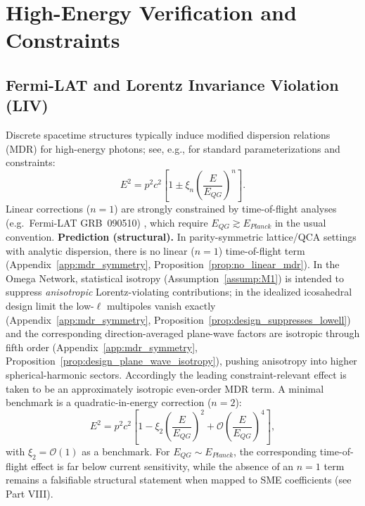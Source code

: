 \section{High-Energy Verification and Constraints}
\label{chap:verification}

\subsection{Fermi-LAT and Lorentz Invariance Violation (LIV)}
Discrete spacetime structures typically induce modified dispersion relations (MDR) for high-energy photons; see, e.g., \cite{Mattingly2005,Colladay1998,KosteleckyMewes2009} for standard parameterizations and constraints:
\begin{equation}
    E^2 = p^2 c^2 \left[ 1 \pm \xi_n \left( \frac{E}{E_{QG}} \right)^n \right].
\end{equation}
Linear corrections ($n=1$) are strongly constrained by time-of-flight analyses (e.g.\ Fermi-LAT GRB~090510) \cite{Abdo2009,Vasileiou2013}, which require $E_{QG} \gtrsim E_{Planck}$ in the usual convention.
\textbf{Prediction (structural).} In parity-symmetric lattice/QCA settings with analytic dispersion, there is no linear ($n=1$) time-of-flight term (Appendix~\ref{app:mdr_symmetry}, Proposition~\ref{prop:no_linear_mdr}). In the Omega Network, statistical isotropy (Assumption~\ref{assump:M1}) is intended to suppress \emph{anisotropic} Lorentz-violating contributions; in the idealized icosahedral design limit the low-$\ell$ multipoles vanish exactly (Appendix~\ref{app:mdr_symmetry}, Proposition~\ref{prop:design_suppresses_lowell}) and the corresponding direction-averaged plane-wave factors are isotropic through fifth order (Appendix~\ref{app:mdr_symmetry}, Proposition~\ref{prop:design_plane_wave_isotropy}), pushing anisotropy into higher spherical-harmonic sectors. Accordingly the leading constraint-relevant effect is taken to be an approximately isotropic even-order MDR term. A minimal benchmark is a quadratic-in-energy correction ($n=2$):
\begin{equation}
    E^2 = p^2 c^2 \left[ 1 - \xi_2 \left( \frac{E}{E_{QG}} \right)^2 + \mathcal{O}\!\left( \frac{E}{E_{QG}} \right)^4 \right],
\end{equation}
with $\xi_2=\mathcal{O}(1)$ as a benchmark. For $E_{QG}\sim E_{Planck}$, the corresponding time-of-flight effect is far below current sensitivity, while the absence of an $n=1$ term remains a falsifiable structural statement when mapped to SME coefficients (see Part VIII).
\par
